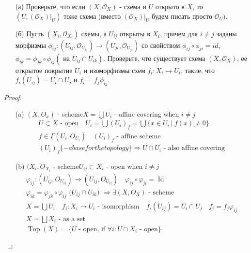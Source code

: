 \begin{prob}
\begin{itemize}
\item[]
\item[(а)] Проверьте, что если $\left(X, \mathcal{O}_X\right)$ - схема и $U$ открыто в $X$, то $\left(U,\left(\mathcal{O}_X\right)\Big|_U\right)$ тоже схема (вместо $(\mathcal{O}_X)\bigg|_U$ будем писать просто $\mathcal{O}_U)$.
\item[(б)] Пусть $\left(X_i, \mathcal{O}_{X_i}\right)$ схемы, а $U_{i j}$ открыты в $X_i$, причем для $i \neq j$ заданы морфизмы $\phi_{i j}:\left(U_{i j}, \mathcal{O}_{U_{i j}}\right) \rightarrow\left(U_{j i}, \mathcal{O}_{U_{j i}}\right)$ со свойством $\phi_{i j} \circ \phi_{j i}=i d$, $\phi_{i k}=\phi_{j k} \circ \phi_{i j}\left(\right.$ на $\left.U_{i j} \cap U_{i k}\right)$. Проверьте, что существует схема $\left(X, \mathcal{O}_X\right)$, ее открытое покрытие $U_i$ и изоморфизмы схем $f_i: X_i \rightarrow U_i$, такие, что $f_i\left(U_{i j}\right)=U_i \cap U_j$ и $f_i=f_j \phi_{i j}$.
\end{itemize}
\end{prob}
\begin{proof}
\begin{itemize}
\item[]
\item[(a)] $(X, O_x)$ - scheme\quad $X = \bigcup U_i$ - affine covering when $i \neq j$
	\begin{gather*}
		U \subset X \text{ - open}\quad U_i = \bigcup (U_i)_f = \bigcup\{x \in U_i\ |\ f(x) \neq 0\}\\
		f \in \Gamma(U_i, O_{U_i})\quad (U_i)_f \text{ - affine scheme}\\
		(U_i)_f \{ - a base for the topology\}
		\Rightarrow U \cap U_i \text{ - also affine covering}
	\end{gather*}
\item[(b)]
	$(X_i, O_{X_i}$ - scheme\quad $U_{ij} \subset X_i$ - open when $i \neq j$
	\begin{gather*}
		\varphi_{ij}: (U_{ij}, O_{U_{ij}}) \to (U_{ij}, O_{U_{ij}})\quad \varphi_{ij} \circ \varphi_{ji} = \operatorname{Id}\\
		\varphi_{ik} = \varphi_{jk} \circ \varphi_{ij} \text{ ($U_{ij} \cap U_{ik}$) }
		\Rightarrow \exists (X, O_X) \text{ - scheme}\\
		X = \bigcup U_i\quad f_i: X_i \to U_i \text{ - isomorphism}\quad f_i(U_{ij}) = U_i \cap U_j\quad f_i = f_j \varphi_{ij}\\
		X = \bigsqcup X_i \text{ - as a set}\\
		\operatorname{Top}(X) = \{U \text{ - open, if } \forall i: U \cap X_i \text{ - open}\}
	\end{gather*}
\end{itemize}
\end{proof}
\begin{comment}

\end{comment}
\vskip 0.6in






